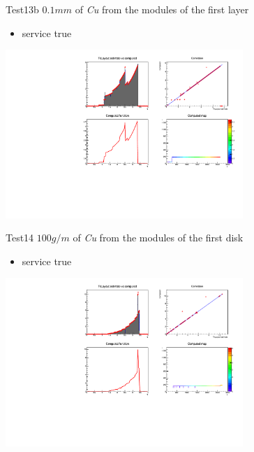 \documentclass[pdftex, 11pt]{beamer}
\begin{document}
\begin{frame}
  \begin{block}{Test13b}
    \alert{$0.1 mm$} of \emph{Cu} from the modules of the first layer
    \begin{itemize}
    \item \alert{service} true
    \end{itemize}
  \end{block}
  \begin{center}
    \includegraphics[width=9cm]{img/test13b.pdf}
  \end{center}
\end{frame}

\begin{frame}
  \begin{block}{Test14}
    \alert{$100 g/m$} of \emph{Cu} from the modules of the first disk
    \begin{itemize}
    \item \alert{service} true
    \end{itemize}
  \end{block}
  \begin{center}
    \includegraphics[width=9cm]{img/test14.pdf}
  \end{center}
\end{frame}
\end{document}
